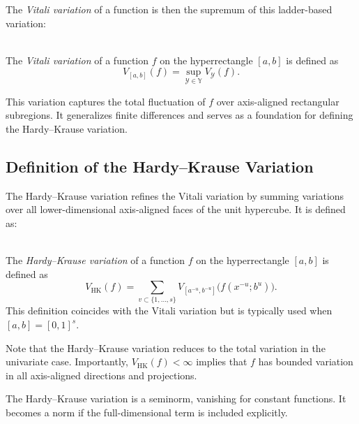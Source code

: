 The \emph{Vitali variation} of a function is then the supremum of this
ladder-based variation:

\begin{definition} \ \\
    The \emph{Vitali variation} of a function $f$ on the hyperrectangle $[a,b]$
    is defined as
    \begin{equation*}
        V_{[a,b]}(f) = \sup_{\mathcal{Y} \in \mathbb{Y}} V_\mathcal{Y}(f).
    \end{equation*}
\end{definition}

This variation captures the total fluctuation of $f$ over axis-aligned
rectangular subregions. It generalizes finite differences and serves as a
foundation for defining the Hardy--Krause variation.

\subsection{Definition of the Hardy--Krause Variation}
\label{sec:hk-variation}

The Hardy--Krause variation refines the Vitali variation by summing variations
over all lower-dimensional axis-aligned faces of the unit hypercube. It is
defined as:

\begin{definition} \ \\
    The \emph{Hardy--Krause variation} of a function $f$ on the hyperrectangle
    $[a,b]$ is defined as
    \begin{equation*}
        V_{\mathrm{HK}}(f) = \sum_{v\subset \{1,\dots,s\}} V_{[a^{-u},b^{-u}]}\big(f(x^{-u};b^u)\big).
    \end{equation*}
    This definition coincides with the Vitali variation but is typically used
    when $[a,b] = [0,1]^s$.
\end{definition}

Note that the Hardy--Krause variation reduces to the total variation in the
univariate case. Importantly, $V_{\mathrm{HK}}(f) < \infty$ implies that $f$ has
bounded variation in all axis-aligned directions and projections.

\begin{remark}
The Hardy--Krause variation is a seminorm, vanishing for constant functions. It
becomes a norm if the full-dimensional term is included explicitly.
\end{remark}

